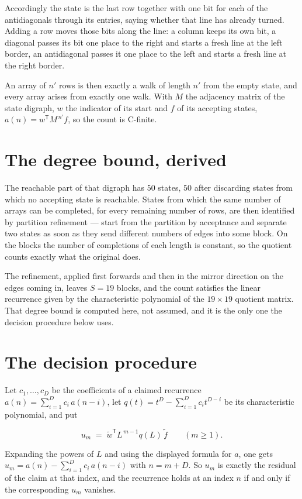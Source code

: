 \documentclass[11pt]{article}
\theoremstyle{definition}
\begin{document}
Accordingly the state is the last row together with one bit for each of the antidiagonals through its entries, saying whether that line has already turned. Adding a row moves those bits along the line: a column keeps its own bit, a diagonal passes its bit one place to the right and starts a fresh line at the left border, an antidiagonal passes it one place to the left and starts a fresh line at the right border.

An array of $n'$ rows is then exactly a walk of length $n'$ from the empty state, and every array arises from exactly one walk. With $M$ the adjacency matrix of the state digraph, $w$ the indicator of its start and $f$ of its accepting states, $a(n) = w^{\mathsf T}M^{\,n'}f$, so the count is C-finite.

\section{The degree bound, derived}

The reachable part of that digraph has $50$ states, $50$ after discarding states from which no accepting state is reachable. States from which the same number of arrays can be completed, for every remaining number of rows, are then identified by partition refinement --- start from the partition by acceptance and separate two states as soon as they send different numbers of edges into some block. On the blocks the number of completions of each length is constant, so the quotient counts exactly what the original does.

The refinement, applied first forwards and then in the mirror direction on the edges coming in, leaves $S = 19$ blocks, and the count satisfies the linear recurrence given by the characteristic polynomial of the $19 \times 19$ quotient matrix. That degree bound is computed here, not assumed, and it is the only one the decision procedure below uses.

\section{The decision procedure}

Let $c_1,\dots,c_D$ be the coefficients of a claimed recurrence $a(n) = \sum_{i=1}^{D} c_i\,a(n-i)$, let $q(t) = t^{D} - \sum_{i=1}^{D} c_i t^{D-i}$ be its characteristic polynomial, and put

\[u_m \;=\; \tilde w^{\mathsf T} L^{\,m-1} q(L)\,\tilde f \qquad (m \ge 1).\]

Expanding the powers of $L$ and using the displayed formula for $a$, one gets $u_m = a(n) - \sum_{i=1}^{D} c_i\,a(n-i)$ with $n = m + D$. So $u_m$ is exactly the residual of the claim at that index, and the recurrence holds at an index $n$ if and only if the corresponding $u_m$ vanishes.
\end{document}
